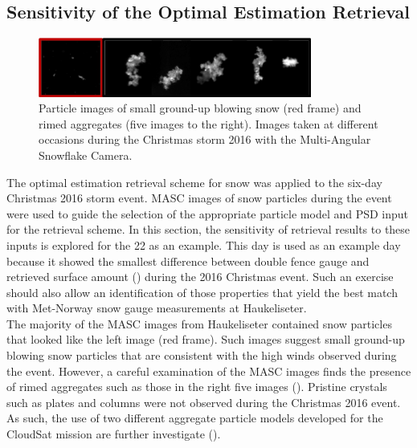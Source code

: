\subsection{Sensitivity of the Optimal Estimation Retrieval}\label{sec:ret:sensitivity}
\begin{figure}[!t]
	\centering
	\includegraphics[width=0.8\textwidth]{./MASC_obs/blow_part}
	\caption{Particle images of small ground-up blowing snow (red frame) and rimed aggregates (five images to the right). Images taken at different occasions during the Christmas storm 2016 with the Multi-Angular Snowflake Camera. }\label{fig:ret:all_part}
\end{figure}
\noindent
The optimal estimation retrieval scheme for snow was applied to the six-day Christmas 2016 storm event.  MASC images of snow particles during the event were used to guide the selection of the appropriate particle model and PSD input for the retrieval scheme. In this section, the sensitivity of retrieval results to these inputs is explored for the \SI{22}{\dec} as an example. 
This day is used as an example day because it showed the smallest difference between double fence gauge and retrieved surface amount () during the 2016 Christmas event.
Such an exercise should also allow an identification of those properties that yield the best match with Met-Norway snow gauge measurements at Haukeliseter.  
\\
The majority of the MASC images from Haukeliseter contained snow particles that looked like the left image  (red frame). Such images suggest small ground-up blowing snow particles that are consistent with the high winds observed during the event.  However, a careful examination of the MASC images finds the presence of rimed aggregates such as those in the right five images (). Pristine crystals such as plates and columns were not observed during the Christmas 2016 event.  As such, the use of two different aggregate particle models developed for the CloudSat mission are further investigate (). 
